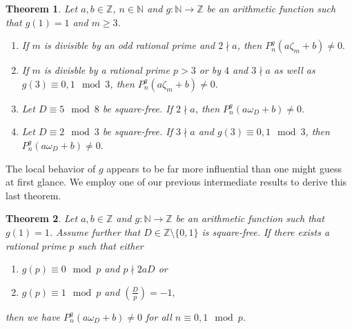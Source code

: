 \documentclass[a4paper, 11pt, reqno]{amsart}
\theoremstyle{plain}
\newtheorem{thm}{Theorem}[section]
\theoremstyle{definition}
\theoremstyle{remark}
\numberwithin{equation}{section}
\newcommand{\C}{\mathbb{C}}
\newcommand{\Z}{\mathbb{Z}}
\newcommand{\N}{\mathbb{N}}
\begin{document}
\begin{thm}\label{thm:NonRootsTranslatingWithRationalIntegers}
    Let $a, b \in \Z$, $n \in \N$ and $g: \N \longrightarrow \Z$ be an arithmetic function such that $g(1) = 1$ and $m \geq 3$.
        \begin{enumerate}
            \item If $m$ is divisible by an odd rational prime and $2 \nmid a$, then
            $P_n^g(a\zeta_m + b) \neq 0.$
            \item If $m$ is divisble by a rational prime $p > 3$ or by $4$ and $3 \nmid a$ as well as $g(3) \equiv 0,1 \mod 3$, then
            $P_n^g(a\zeta_m + b) \neq 0.$
            \item Let $D \equiv 5 \mod 8$ be square-free. If $2 \nmid a$, then $P_n^g(a\omega_D + b) \neq 0.$
            \item Let $D \equiv 2 \mod 3$ be square-free. If $3 \nmid a$ and $g(3) \equiv 0, 1 \mod 3$, then
            $P_n^g(a\omega_D + b) \neq 0.$
        \end{enumerate}
\end{thm}

The local behavior of $g$ appears to be far more influential than one might guess at first glance. We employ one of our previous intermediate results to derive this last theorem.

\begin{thm}\label{thm:NotRamifiedThm}
    Let $a, b \in \Z$ and $g: \N \longrightarrow \Z$ be an arithmetic function such that $g(1) = 1$. Assume further that $D \in \Z \setminus \{0,1\}$ is square-free. If there exists a rational prime $p$ such that either
    \begin{enumerate}
        \item $g(p) \equiv 0 \mod p$ and $p \nmid 2aD$ or
        \item $g(p) \equiv 1 \mod p$ and $\left(\frac{D}{p}\right) = -1,$
    \end{enumerate} then we have $P_n^g(a\omega_D + b) \neq 0$ for all $n \equiv 0, 1 \mod p$.
\end{thm}

\end{document}
